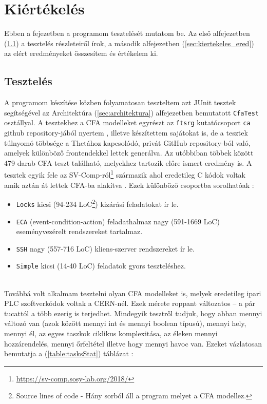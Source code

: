 \chapter{Kiértékelés}
\label{sec:kiertekeles}

Ebben a fejezetben a programom tesztelését mutatom be. Az első alfejezetben (\ref{sec:kiertekeles_teszt}) a tesztelés részleteiről írok, a második alfejezetben (\ref{sec:kiertekeles_ered}) az elért eredményeket összesítem és értékelem ki.

\section{Tesztelés}
\label{sec:kiertekeles_teszt}
A programom készítése közben folyamatosan teszteltem azt JUnit tesztek segítségével az Architektúra (\ref{sec:architektura}) alfejezetben bemutatott \texttt{CfaTest} osztállyal. A tesztekhez a CFA modelleket egyrészt az \texttt{ftsrg} kutatócsoport \texttt{ca} github repository-jából nyertem \cite{ca-lab-tests}, illetve készítettem sajátokat is, de a tesztek túlnyomó többsége a Thetához kapcsolódó, privát GitHub repository-ból való, amelyek különböző frontendekkel lettek generálva. Az utóbbiban többek között 479 darab CFA teszt található, melyekhez tartozik előre ismert eredmény is. A tesztek egyik fele az SV-Comp-ról\footnote{\url{https://sv-comp.sosy-lab.org/2018/}} származik ahol eredetileg C kódok voltak amik aztán át lettek CFA-ba alakítva \cite{vpt2017}. Ezek különböző csoportba sorolhatóak \cite{akos-phd}:

\begin{itemize}
	\label{felsorolas}
	
	\item \texttt{Locks} kicsi (94-234 LoC\footnote{Source lines of code - Hány sorból áll a program melyet a CFA modellez.}) kizárási feladatokat ír le.
	
	\item \texttt{ECA} (event-condition-action) feladathalmaz nagy (591-1669 LoC) eseményvezérelt rendszereket tartalmaz.
	
	\item \texttt{SSH} nagy (557-716 LoC) kliens-szerver rendszereket ír le.
	
	\item \texttt{Simple} kicsi (14-40 LoC) feladatok gyors teszteléshez.
\end{itemize}
\ \\
Továbbá volt alkalmam tesztelni olyan CFA modelleket is, melyek eredetileg ipari PLC szoftverkódok voltak a CERN-nél. \cite{darvas2019plcverif} Ezek mérete roppant változatos -- a pár tucattól a több ezerig is terjedhet. Mindegyik tesztről tudjuk, hogy abban mennyi változó van (azok között mennyi int és mennyi boolean típusú), mennyi hely, mennyi él, az egyes taszkok ciklikus komplexitása, az éleken mennyi hozzárendelés, mennyi őrfeltétel illetve hogy mennyi havoc van. Ezeket vázlatosan bemutatja a (\ref{table:tasksStat}) táblázat \cite{akos-phd}:

